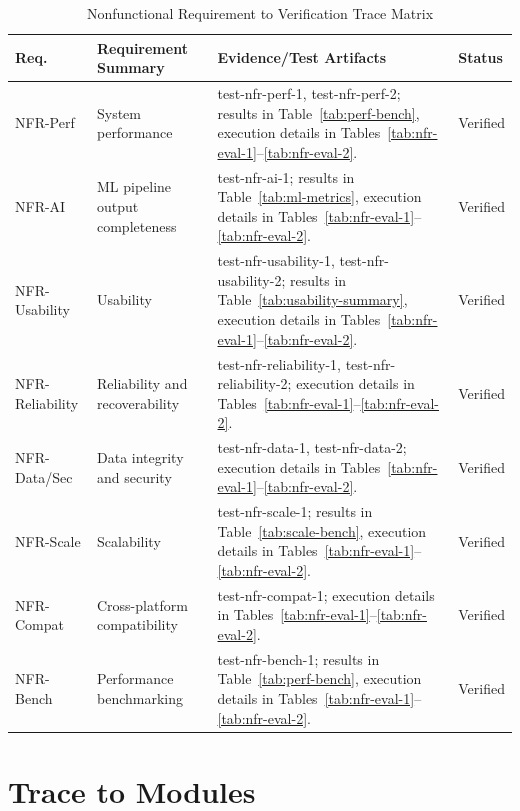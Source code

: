 \documentclass[12pt, titlepage]{article}
\begin{document}
\begin{table}[H]
\centering
\footnotesize
\setlength{\tabcolsep}{3pt}
\caption{Nonfunctional Requirement to Verification Trace Matrix}
\begin{tabularx}{\textwidth}{p{1.8cm}X X p{0.9cm}}
\toprule
\textbf{Req.} & \textbf{Requirement Summary} & \textbf{Evidence/Test Artifacts} & \textbf{Status}\\
\midrule
NFR-Perf & System performance & test-nfr-perf-1, test-nfr-perf-2; results in Table~\ref{tab:perf-bench}, execution details in Tables~\ref{tab:nfr-eval-1}--\ref{tab:nfr-eval-2}. & Verified\\
NFR-AI & ML pipeline output completeness & test-nfr-ai-1; results in Table~\ref{tab:ml-metrics}, execution details in Tables~\ref{tab:nfr-eval-1}--\ref{tab:nfr-eval-2}. & Verified\\
NFR-Usability & Usability & test-nfr-usability-1, test-nfr-usability-2; results in Table~\ref{tab:usability-summary}, execution details in Tables~\ref{tab:nfr-eval-1}--\ref{tab:nfr-eval-2}. & Verified\\
NFR-Reliability & Reliability and recoverability & test-nfr-reliability-1, test-nfr-reliability-2; execution details in Tables~\ref{tab:nfr-eval-1}--\ref{tab:nfr-eval-2}. & Verified\\
NFR-Data/Sec & Data integrity and security & test-nfr-data-1, test-nfr-data-2; execution details in Tables~\ref{tab:nfr-eval-1}--\ref{tab:nfr-eval-2}. & Verified\\
NFR-Scale & Scalability & test-nfr-scale-1; results in Table~\ref{tab:scale-bench}, execution details in Tables~\ref{tab:nfr-eval-1}--\ref{tab:nfr-eval-2}. & Verified\\
NFR-Compat & Cross-platform compatibility & test-nfr-compat-1; execution details in Tables~\ref{tab:nfr-eval-1}--\ref{tab:nfr-eval-2}. & Verified\\
NFR-Bench & Performance benchmarking & test-nfr-bench-1; results in Table~\ref{tab:perf-bench}, execution details in Tables~\ref{tab:nfr-eval-1}--\ref{tab:nfr-eval-2}. & Verified\\
\bottomrule
\end{tabularx}
\setlength{\tabcolsep}{6pt}
\end{table}

\FloatBarrier

\section{Trace to Modules}
\end{document}
